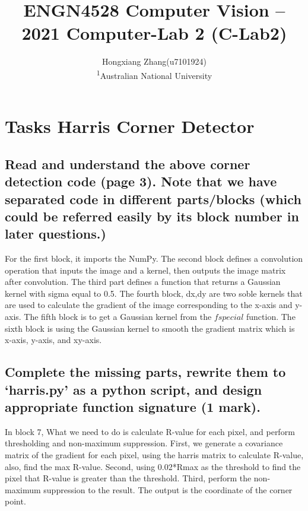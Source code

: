 \documentclass[]{article}
\newcommand*{\affaddr}[1]{#1}
\newcommand*{\affmark}[1][*]{\textsuperscript{#1}}
\begin{document}
\title{ENGN4528 Computer Vision – 2021 Computer-Lab 2 (C-Lab2)}

\author{Hongxiang Zhang(u7101924)\\
	\affaddr{\affmark[1]Australian National University}
}


\maketitle
%
\section{Tasks Harris Corner Detector}
\subsection{Read and understand the above corner detection code (page 3). Note that we have separated code in different parts/blocks (which could be referred easily by its block number in later questions.)}
For the first block, it imports the NumPy. The second block defines a convolution operation that inputs the image and a kernel, then outputs the image matrix after convolution. The third part defines a function that returns a Gaussian kernel with sigma equal to 0.5. The fourth block, dx,dy are two soble kernels that are used to calculate the gradient of the image corresponding to the x-axis and y-axis. The fifth block is to get a Gaussian kernel from the $fspecial$ function. The sixth block is using the Gaussian kernel to smooth the gradient matrix which is x-axis, y-axis, and xy-axis.
\subsection{Complete the missing parts, rewrite them to ‘harris.py’ as a python script, and design appropriate function signature (1 mark).}
In block 7, What we need to do is calculate R-value for each pixel, and perform thresholding and non-maximum suppression. First, we generate a covariance matrix of the gradient for each pixel, using the harris matrix to calculate R-value, also, find the max R-value. Second, using 0.02*Rmax as the threshold to find the pixel that R-value is greater than the threshold. Third, perform the non-maximum suppression to the result. The output is the coordinate of the corner point.
\end{document}
